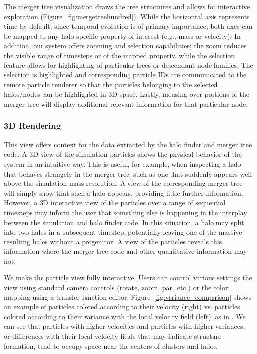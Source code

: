 The merger tree visualization draws the tree structures and allows for interactive exploration (Figure~\ref{fig:mergetreehundred}). While the horizontal axis represents time by default, since temporal evolution is of primary importance, both axes can be mapped to any halo-specific property of interest (e.g., mass or velocity). In addition, our system offers zooming and selection capabilities; the zoom reduces the visible range of timesteps or of the mapped property, while the selection feature allows for highlighting of particular trees or descendant node families. The selection is highlighted and corresponding particle IDs are communicated to the remote particle renderer so that the particles belonging to the selected halos/nodes can be highlighted in 3D space. Lastly, mousing over portions of the merger tree will display additional relevant information for that particular node.

\subsubsection{3D Rendering}
This view offers context for the data extracted by the halo finder and merger tree code. A 3D view of the simulation particles shows the physical behavior of the system in an intuitive way. This is useful, for example, when inspecting a halo that behaves strangely in the merger tree, such as one that suddenly appears well above the simulation mass resolution. A view of the corresponding merger tree will simply show that such a halo appears, providing little further information. However, a 3D interactive view of the particles over a range of sequential timesteps may inform the user that something else is happening in the interplay between the simulation and halo finder code. In this situation, a halo may split into two halos in a subsequent timestep, potentially leaving one of the massive resulting halos without a progenitor. A view of the particles reveals this information where the merger tree code and other quantitative information may not.

We make the particle view fully interactive. Users can control various settings the view using standard camera controls (rotate, zoom, pan, etc.) or the color mapping using a transfer function editor. Figure~\ref{fig:variance_comparison} shows an example of particles colored according to their velocity (right) vs. particles colored according to their variance with the local velocity field (left), as in \cite{Popov:2011}. We can see that particles with higher velocities and particles with higher variances, or differences with their local velocity fields that may indicate structure formation, tend to occupy space near the centers of clusters and halos.

